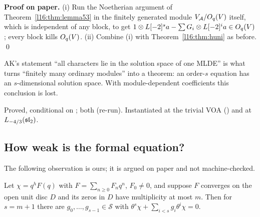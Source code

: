 \textbf{Proof on paper.} (i) Run the Noetherian argument of Theorem~\ref{l16:thm:lemma53} in the finitely generated
module $V_{\mathcal A}/O_q(V)$ itself, which is independent of any block, to get
$1\otimes L[-2]^sa - \sum G_i\otimes L[-2]^ia\in O_q(V)$; every block kills $O_q(V)$. (ii) Combine (i) with
Theorem~\ref{l16:thm:huni} as before. \qed

\begin{physics}
AK's statement ``all characters lie in the solution space of one MLDE'' is what turns ``finitely many ordinary modules''
into a theorem: an order-$s$ equation has an $s$-dimensional solution space. With module-dependent coefficients this
conclusion is lost.
\end{physics}

\begin{status}
Proved, conditional on ; both \lean{[propext, Classical.}\allowbreak{}\allowbreak\lean{sound]} (re-run). Instantiated at the
trivial VOA (\allowbreak{}\allowbreak{}\allowbreak{}\allowbreak{}) and at $L_{-4/3}(\mathfrak{sl}_2)$.
\end{status}

\subsection{How weak is the formal equation?}\label{l16:sec:weak}

The following observation is ours; it is argued on paper and not machine-checked.

\begin{proposition}\label{l16:prop:weak}
Let $\chi = q^h F(q)$ with $F = \sum_{n\ge0}F_nq^n$, $F_0\ne0$, and suppose $F$ converges on the open unit disc $D$ and its
zeros in $D$ have multiplicity at most $m$. Then for $s = m+1$ there are $g_0,\dots,g_{s-1}\in\mathcal S$ with
$\theta^s\chi + \sum_{i<s}g_i\theta^i\chi = 0$.
\end{proposition}


